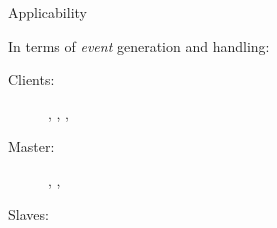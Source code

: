 \begin{frame}{Applicability}
\end{frame}

\begin{frame}{}
  In terms of \emph{event} generation and handling:
  \begin{description}
    \item[Clients:] \ebegin, \eread, \ewrite, \eend%
    \item[Master:] \estart, \ecommit, \esend%
    \item[Slaves:] \ereceive%
  \end{description}
\end{frame}

\begin{frame}{}
  \begin{center}
    \begin{minipage}{1.0\textwidth}
      
    \end{minipage}
  \end{center}
\end{frame}

\begin{frame}{}
  \begin{center}
  \end{center}
\end{frame}

\begin{frame}{}
  \begin{center}
    \begin{minipage}{1.0\textwidth}
      
    \end{minipage}
  \end{center}
\end{frame}

\begin{frame}{}
  \begin{center}
    \begin{minipage}{1.0\textwidth}
      
    \end{minipage}
  \end{center}
\end{frame}

